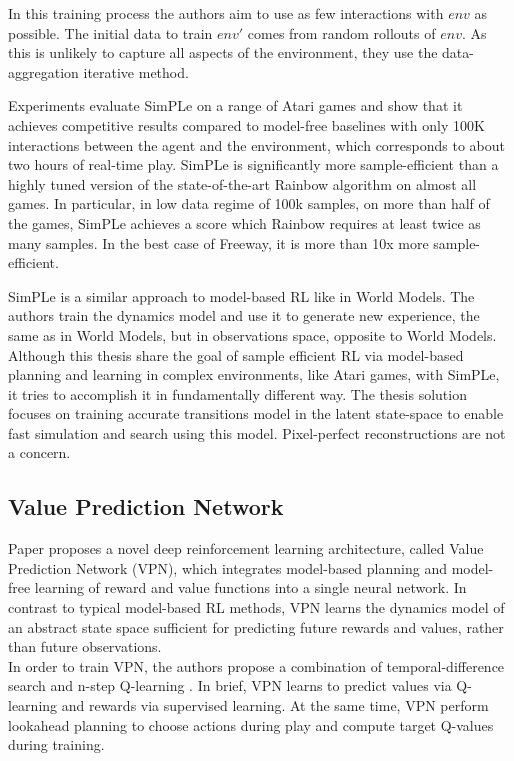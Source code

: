 In this training process the authors aim to use as few interactions with $env$ as possible. The initial data to train $env'$ comes from random rollouts of $env$. As this is unlikely to capture all aspects of the environment, they use the data-aggregation iterative method.

Experiments evaluate SimPLe on a range of Atari games and show that it achieves competitive results compared to model-free baselines with only 100K interactions between the agent and the environment, which corresponds to about two hours of real-time play. SimPLe is significantly more sample-efficient than a highly tuned version of the state-of-the-art Rainbow algorithm \cite{Algo.Rainbow} on almost all games. In particular, in low data regime of 100k samples, on more than half of the games, SimPLe achieves a score which Rainbow requires at least twice as many samples. In the best case of Freeway, it is more than 10x more sample-efficient.

SimPLe is a similar approach to model-based RL like in World Models. The authors train the dynamics model and use it to generate new experience, the same as in World Models, but in observations space, opposite to World Models. \\
Although this thesis share the goal of sample efficient RL via model-based planning and learning in complex environments, like Atari games, with SimPLe, it tries to accomplish it in fundamentally different way. The thesis solution focuses on training accurate transitions model in the latent state-space to enable fast simulation and search using this model. Pixel-perfect reconstructions are not a concern.

\subsection{Value Prediction Network}

Paper \cite{Algo.VPN} proposes a novel deep reinforcement learning architecture, called Value Prediction Network (VPN), which integrates model-based planning and model-free learning of reward and value functions into a single neural network. In contrast to typical model-based RL methods, VPN learns the dynamics model of an abstract state space sufficient for predicting future rewards and values, rather than future observations. \\
In order to train VPN, the authors propose a combination of temporal-difference search \cite{Algo.TDSearch} and n-step Q-learning \cite{Algo.A3C}. In brief, VPN learns to predict values via Q-learning and rewards via supervised learning. At the same time, VPN perform lookahead planning to choose actions during play and compute target Q-values during training.

